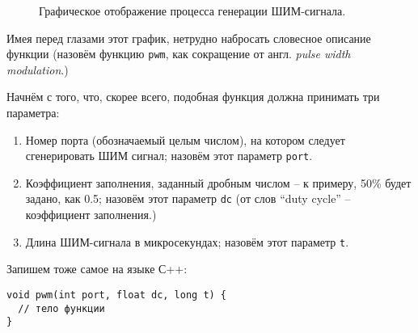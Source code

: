 \documentclass[../sparc.tex]{subfiles}
\begin{document}
\begin{figure}[ht]
  \caption{Графическое отображение процесса генерации ШИМ-сигнала.}
  \label{fig:pwm-graph}
\end{figure}

Имея перед глазами этот график, нетрудно набросать словесное описание функции
(назовём функцию \texttt{pwm}, как сокращение от англ. \emph{pulse width
  modulation}.)

Начнём с того, что, скорее всего, подобная функция должна принимать три
параметра:
\begin{enumerate}
\item Номер порта (обозначаемый целым числом), на котором следует сгенерировать
  ШИМ сигнал; назовём этот параметр \texttt{port}.
\item Коэффициент заполнения, заданный дробным числом -- к примеру, 50\% будет
  задано, как 0.5; назовём этот параметр \texttt{dc} (от слов ``duty cycle'' --
  коэффициент заполнения.)
\item Длина ШИМ-сигнала в микросекундах; назовём этот параметр
  \texttt{t}.
\end{enumerate}

Запишем тоже самое на языке С++:

\begin{verbatim}
void pwm(int port, float dc, long t) {
  // тело функции
}
\end{verbatim}
\end{document}
